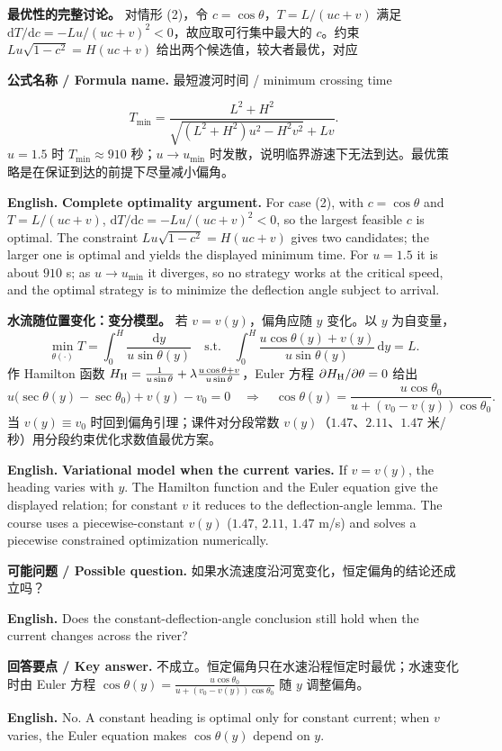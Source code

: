 \documentclass[UTF8,11pt,a4paper]{ctexart}
\newcommand{\EN}[1]{\par\noindent\textbf{English.} #1\par}
\newcommand{\FORMULA}[2]{\par\noindent\textbf{公式名称 / Formula name.} #1 / #2\par}
\newcommand{\ASK}[4]{\par\noindent\textbf{可能问题 / Possible question.} #1\par\EN{#2}\noindent\textbf{回答要点 / Key answer.} #3\par\EN{#4}\smallskip}
\begin{document}
\noindent\textbf{最优性的完整讨论。} 对情形 (2)，令 $c=\cos\theta$，$T=L/(uc+v)$ 满足 $\mathrm dT/\mathrm dc=-Lu/(uc+v)^2<0$，故应取可行集中最大的 $c$。约束 $Lu\sqrt{1-c^2}=H(uc+v)$ 给出两个候选值，较大者最优，对应
\FORMULA{最短渡河时间}{minimum crossing time}
\[
T_{\min}=\frac{L^2+H^2}{\sqrt{(L^2+H^2)u^2-H^2v^2}+Lv}.
\]
$u=1.5$ 时 $T_{\min}\approx910$ 秒；$u\to u_{\min}$ 时发散，说明临界游速下无法到达。最优策略是在保证到达的前提下尽量减小偏角。
\EN{\textbf{Complete optimality argument.} For case (2), with $c=\cos\theta$ and $T=L/(uc+v)$, $\mathrm dT/\mathrm dc=-Lu/(uc+v)^2<0$, so the largest feasible $c$ is optimal. The constraint $Lu\sqrt{1-c^2}=H(uc+v)$ gives two candidates; the larger one is optimal and yields the displayed minimum time. For $u=1.5$ it is about $910$ s; as $u\to u_{\min}$ it diverges, so no strategy works at the critical speed, and the optimal strategy is to minimize the deflection angle subject to arrival.}
\noindent\textbf{水流随位置变化：变分模型。} 若 $v=v(y)$，偏角应随 $y$ 变化。以 $y$ 为自变量，
\[
\min_{\theta(\cdot)}T=\int_0^H\frac{\mathrm dy}{u\sin\theta(y)}
\quad\text{s.t.}\quad
\int_0^H\frac{u\cos\theta(y)+v(y)}{u\sin\theta(y)}\,\mathrm dy=L .
\]
作 Hamilton 函数 $H_{\rm H}=\frac{1}{u\sin\theta}+\lambda\frac{u\cos\theta+v}{u\sin\theta}$，Euler 方程 $\partial H_{\rm H}/\partial\theta=0$ 给出
\[
u\big(\sec\theta(y)-\sec\theta_0\big)+v(y)-v_0=0
\quad\Longrightarrow\quad
\cos\theta(y)=\frac{u\cos\theta_0}{u+(v_0-v(y))\cos\theta_0}.
\]
当 $v(y)\equiv v_0$ 时回到偏角引理；课件对分段常数 $v(y)$（$1.47$、$2.11$、$1.47$ 米/秒）用分段约束优化求数值最优方案。
\EN{\textbf{Variational model when the current varies.} If $v=v(y)$, the heading varies with $y$. The Hamilton function and the Euler equation give the displayed relation; for constant $v$ it reduces to the deflection-angle lemma. The course uses a piecewise-constant $v(y)$ ($1.47$, $2.11$, $1.47$ m/s) and solves a piecewise constrained optimization numerically.}
\ASK{如果水流速度沿河宽变化，恒定偏角的结论还成立吗？}{Does the constant-deflection-angle conclusion still hold when the current changes across the river?}{不成立。恒定偏角只在水速沿程恒定时最优；水速变化时由 Euler 方程 $\cos\theta(y)=\frac{u\cos\theta_0}{u+(v_0-v(y))\cos\theta_0}$ 随 $y$ 调整偏角。}{No. A constant heading is optimal only for constant current; when $v$ varies, the Euler equation makes $\cos\theta(y)$ depend on $y$.}
\end{document}
